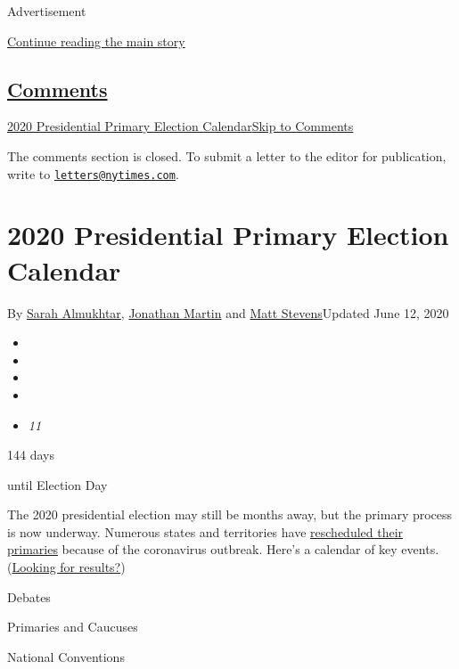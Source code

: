 Advertisement

\protect\hyperlink{after-top}{Continue reading the main story}

\hypertarget{comments}{%
\subsection{\texorpdfstring{\protect\hyperlink{commentsContainer}{Comments}}{Comments}}\label{comments}}

\href{}{2020 Presidential Primary Election Calendar}\href{}{Skip to
Comments}

The comments section is closed. To submit a letter to the editor for
publication, write to
\href{mailto:letters@nytimes.com}{\nolinkurl{letters@nytimes.com}}.

\hypertarget{2020-presidential-primary-election-calendar}{%
\section{2020 Presidential Primary Election
Calendar}\label{2020-presidential-primary-election-calendar}}

By \href{https://www.nytimes.com/by/sarah-almukhtar}{Sarah Almukhtar},
\href{https://www.nytimes.com/by/jonathan-martin}{Jonathan Martin} and
\href{https://www.nytimes.com/by/matt-stevens}{Matt Stevens}Updated June
12, 2020

\begin{itemize}
\item
\item
\item
\item
\item
  \emph{11}
\end{itemize}

144 days

until Election Day

The 2020 presidential election may still be months away, but the primary
process is now underway. Numerous states and territories have
\href{https://www.nytimes.com/article/2020-campaign-primary-calendar-coronavirus.html}{rescheduled
their primaries} because of the coronavirus outbreak. Here's a calendar
of key events.
(\href{https://www.nytimes.com/interactive/2020/us/elections/delegate-count-primary-results.html}{Looking
for results?})

Debates

Primaries and Caucuses

National Conventions


